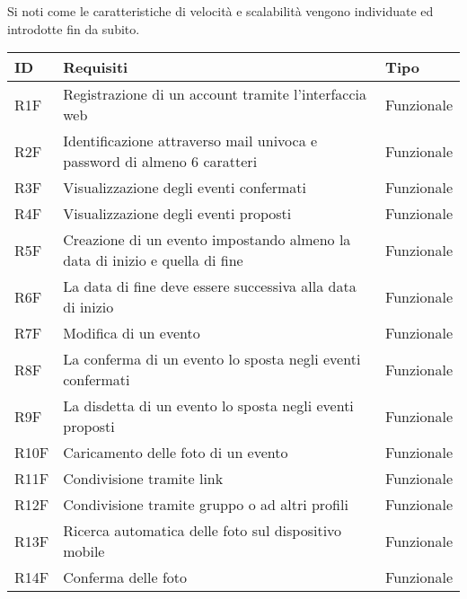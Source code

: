 Si noti come le caratteristiche di velocità e scalabilità vengono individuate ed introdotte fin da subito.
\begin{longtable} {|P{1.3cm}|P{11.2cm}|P{3cm}|}
    \hline
    \textbf{ID} & \textbf{Requisiti}                                                          & \textbf{Tipo}  \\
    \hline
    R1F         & Registrazione di un account tramite l’interfaccia web                       & Funzionale     \\
    \hline
    R2F         & Identificazione attraverso mail univoca e password di almeno 6 caratteri    & Funzionale     \\
    \hline
    R3F         & Visualizzazione degli eventi confermati                                     & Funzionale     \\
    \hline
    R4F         & Visualizzazione degli eventi proposti                                       & Funzionale     \\
    \hline
    R5F         & Creazione di un evento impostando almeno la data di inizio e quella di fine & Funzionale     \\
    \hline
    R6F         & La data di fine deve essere successiva alla data di inizio                  & Funzionale     \\
    \hline
    R7F         & Modifica di un evento                                                       & Funzionale     \\
    \hline
    R8F         & La conferma di un evento lo sposta negli eventi confermati                  & Funzionale     \\
    \hline
    R9F         & La disdetta di un evento lo sposta negli eventi proposti                    & Funzionale     \\
    \hline
    R10F        & Caricamento delle foto di un evento                                         & Funzionale     \\
    \hline
    R11F        & Condivisione tramite link                                                   & Funzionale     \\
    \hline
    R12F        & Condivisione tramite gruppo o ad altri profili                              & Funzionale     \\
    \hline
    R13F        & Ricerca automatica delle foto sul dispositivo mobile                        & Funzionale     \\
    \hline
    R14F        & Conferma delle foto                                                         & Funzionale     \\

\end{longtable}

